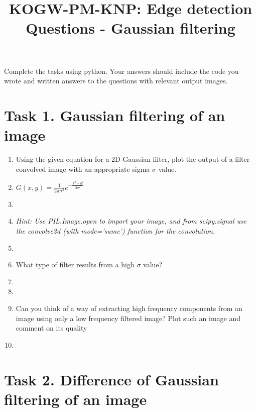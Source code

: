 \documentclass[12pt,english]{scrartcl}
\title{KOGW-PM-KNP: Edge detection Questions - Gaussian filtering}
\begin{document}
\maketitle

Complete the tasks using python. Your answers should include the code you wrote and written answers to the questions with relevant output images.

\section*{Task 1. Gaussian filtering of an image}

\begin{enumerate}
 \item Using the given equation for a 2D Gaussian filter, plot the output of a filter-convolved image with an appropriate sigma $\sigma$ value. \\
 \item[]
 \centering
 $G(x,y) = \frac{1}{2\pi\sigma^2} e^{-\frac{x^2+y^2}{2\sigma^2}}$
 \item[]
 \raggedright
 \color{black}
 \item[] \textit{Hint: Use PIL.Image.open to import your image, and from scipy.signal use the convolve2d (with mode='same') function for the convolution.} \\
 \item[]

 \color{black} 
 \item What type of filter results from a high $\sigma$ value? \\
 \item[]
 \item[]

 \color{black}
 \item Can you think of a way of extracting high frequency components from an image using only a low frequency filtered image? Plot such an image and comment on its quality
 \item[]

 \end{enumerate}

\section*{Task 2. Difference of Gaussian filtering of an image}
\end{document}

